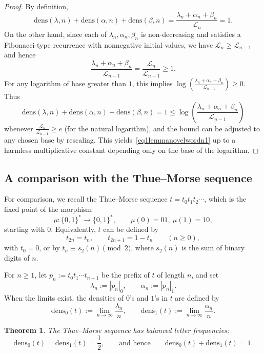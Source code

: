 \documentclass[12pt]{amsart}
\newtheorem{theorem}{Theorem}[section]
\begin{document}
\begin{proof}
By definition,
\[
\mathrm{dens}(\lambda,n) + \mathrm{dens}(\alpha,n) + \mathrm{dens}(\beta,n)
= \frac{\lambda_n + \alpha_n + \beta_n}{\mathcal{L}_n}
= 1.
\]
On the other hand, since each of $\lambda_n,\alpha_n,\beta_n$ is non-decreasing and satisfies a Fibonacci-type recurrence with nonnegative initial values, we have $\mathcal{L}_n \ge \mathcal{L}_{n-1}$ and hence
\[
\frac{\lambda_n + \alpha_n + \beta_n}{\mathcal{L}_{n-1}}
= \frac{\mathcal{L}_n}{\mathcal{L}_{n-1}} \ge 1.
\]
For any logarithm of base greater than $1$, this implies $\log\!\left(\frac{\lambda_n + \alpha_n + \beta_n}{\mathcal{L}_{n-1}}\right)\ge 0$. Thus
\[
\mathrm{dens}(\lambda,n) + \mathrm{dens}(\alpha,n) + \mathrm{dens}(\beta,n)
= 1 \le \log\!\left(\frac{\lambda_n + \alpha_n + \beta_n}{\mathcal{L}_{n-1}}\right)
\]
whenever $\frac{\mathcal{L}_n}{\mathcal{L}_{n-1}}\ge e$ (for the natural logarithm), and the bound can be adjusted to any chosen base by rescaling. This yields~\eqref{eq1lemmanovelwordn1} up to a harmless multiplicative constant depending only on the base of the logarithm.
\end{proof}

\subsection{A comparison with the Thue--Morse sequence}

For comparison, we recall the Thue--Morse sequence $t = t_0 t_1 t_2 \cdots$, which is the fixed point of the morphism
\[
\mu : \{0,1\}^* \to \{0,1\}^*,\qquad \mu(0)=01,\ \mu(1)=10,
\]
starting with $0$. Equivalently, $t$ can be defined by
\[
t_{2n} = t_n,\qquad t_{2n+1} = 1 - t_n \qquad (n\ge 0),
\]
with $t_0=0$, or by $t_n \equiv s_2(n)\pmod{2}$, where $s_2(n)$ is the sum of binary digits of $n$.

For $n\ge 1$, let $p_n := t_0 t_1\cdots t_{n-1}$ be the prefix of $t$ of length $n$, and set
\[
\lambda_n := |p_n|_0,\qquad \alpha_n := |p_n|_1.
\]
When the limits exist, the densities of $0$'s and $1$'s in $t$ are defined by
\[
\mathrm{dens}_0(t) := \lim_{n\to\infty} \frac{\lambda_n}{n},
\qquad
\mathrm{dens}_1(t) := \lim_{n\to\infty} \frac{\alpha_n}{n}.
\]

\begin{theorem}\label{Thmmorsn1}
The Thue--Morse sequence has balanced letter frequencies:
\begin{equation}\label{eq1Thmmorsn1}
\mathrm{dens}_0(t) = \mathrm{dens}_1(t) = \frac{1}{2},
\qquad\text{and hence}\qquad
\mathrm{dens}_0(t) + \mathrm{dens}_1(t) = 1.
\end{equation}
\end{theorem}
\end{document}
